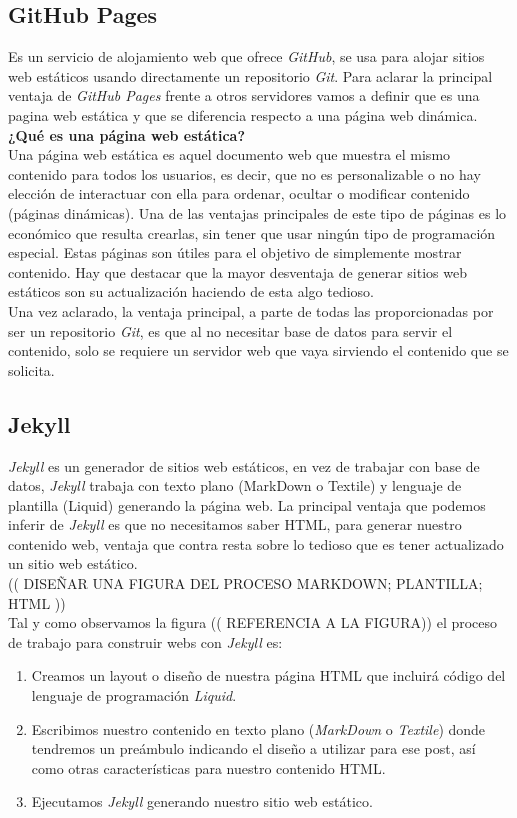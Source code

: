 \documentclass[a4paper, 12pt]{book}
\begin{document}
\subsection{GitHub Pages}
\label{subsec:githubpages}
Es un servicio de alojamiento web que ofrece \emph{GitHub}, se usa para alojar sitios web estáticos usando directamente un repositorio \emph{Git}. Para aclarar la principal ventaja de \emph{GitHub Pages} frente a otros servidores vamos a definir que es una pagina web estática y que se diferencia respecto a una página web dinámica. \\
\textbf{¿Qué es una página web estática?}\\
Una página web estática es aquel documento web que muestra el mismo contenido para todos los usuarios, es decir, que no es personalizable o no hay elección de interactuar con ella para ordenar, ocultar o modificar contenido (páginas dinámicas). Una de las ventajas principales de este tipo de páginas es lo económico que resulta crearlas, sin tener que usar ningún tipo de programación especial. Estas páginas son útiles para el objetivo de simplemente mostrar contenido. Hay que destacar que la mayor desventaja de generar sitios web estáticos son su actualización haciendo de esta algo tedioso. \\ 
Una vez aclarado, la ventaja principal, a parte de todas las proporcionadas por ser un repositorio \emph{Git}, es que al no necesitar base de datos para servir el contenido, solo se requiere un servidor web que vaya sirviendo el contenido que se solicita.

\subsection{Jekyll}
\label{subsec:jekyll}
\emph{Jekyll} es un generador de sitios web estáticos, en vez de trabajar con base de datos, \emph{Jekyll} trabaja con texto plano (MarkDown o Textile) y lenguaje de plantilla (Liquid)  generando la página web. La principal ventaja que podemos inferir de \emph{Jekyll} es que no necesitamos saber HTML, para generar nuestro contenido web, ventaja que contra resta sobre lo tedioso que es tener actualizado un sitio web estático.   \\
(( DISEÑAR UNA FIGURA DEL PROCESO MARKDOWN; PLANTILLA; HTML ))\\
Tal y como observamos la figura (( REFERENCIA A LA FIGURA)) el proceso de trabajo para construir webs con \emph{Jekyll} es:
\begin{enumerate}
    \item Creamos un layout o diseño de nuestra página HTML que incluirá  código del lenguaje de programación \emph{Liquid}.
    \item Escribimos nuestro contenido en texto plano (\emph{MarkDown} o \emph{Textile}) donde tendremos un preámbulo indicando el diseño a utilizar para ese post, así como otras características para nuestro contenido HTML.
    \item Ejecutamos \emph{Jekyll} generando nuestro sitio web estático.
\end{enumerate}
\end{document}
